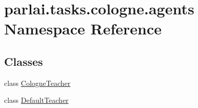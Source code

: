 \hypertarget{namespaceparlai_1_1tasks_1_1cologne_1_1agents}{}\section{parlai.\+tasks.\+cologne.\+agents Namespace Reference}
\label{namespaceparlai_1_1tasks_1_1cologne_1_1agents}
\subsection*{Classes}
\begin{DoxyCompactItemize}
\item 
class \hyperlink{classparlai_1_1tasks_1_1cologne_1_1agents_1_1CologneTeacher}{Cologne\+Teacher}
\item 
class \hyperlink{classparlai_1_1tasks_1_1cologne_1_1agents_1_1DefaultTeacher}{Default\+Teacher}
\end{DoxyCompactItemize}
